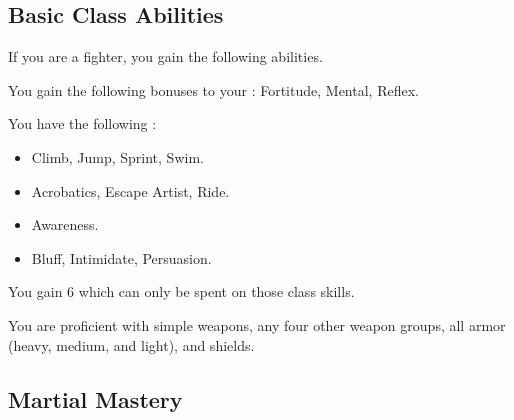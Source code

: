     \subsection{Basic Class Abilities}
        If you are a fighter, you gain the following abilities.

        You gain the following bonuses to your :  Fortitude,  Mental,  Reflex.

        You have the following :
        \begin{itemize}
            \item {} Climb, Jump, Sprint, Swim.
            \item {} Acrobatics, Escape Artist, Ride.
            \item {} Awareness.
            \item {} Bluff, Intimidate, Persuasion.
        \end{itemize}
        You gain 6  which can only be spent on those class skills.

        You are proficient with simple weapons, any four other weapon groups, all armor (heavy, medium, and light), and shields.

    \subsection{Martial Mastery}

